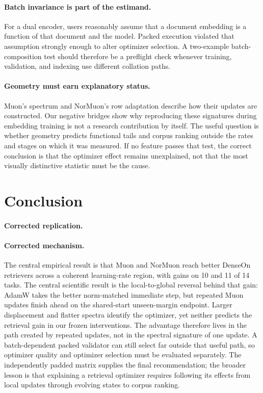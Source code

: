 \documentclass[11pt]{article}
\begin{document}
\paragraph{Batch invariance is part of the estimand.}
For a dual encoder, users reasonably assume that a document embedding is a function of that document
and the model. Packed execution violated that assumption strongly enough to alter optimizer
selection. A two-example batch-composition test should therefore be a preflight check whenever
training, validation, and indexing use different collation paths.

\paragraph{Geometry must earn explanatory status.}
Muon's spectrum and NorMuon's row adaptation describe how their updates are constructed. Our
negative bridges show why reproducing these signatures during embedding training is not a research
contribution by itself. The useful question is whether geometry predicts functional tails and
corpus ranking outside the rates and stages on which it was measured. If no feature passes that
test, the correct conclusion is that the optimizer effect remains unexplained, not that the most
visually distinctive statistic must be the cause.

\CandidateBreadthDiscussion

\FloatBarrier

\section{Conclusion}

\paragraph{Corrected replication.}
\CorrectedConclusionFinding

\paragraph{Corrected mechanism.}
\StateOperatorConclusionFinding

The central empirical result is that Muon and NorMuon reach better DenseOn retrievers across a
coherent learning-rate region, with gains on 10 and 11 of 14 tasks. The central scientific result is
the local-to-global reversal behind that gain: AdamW takes the better norm-matched immediate step,
but repeated Muon updates finish ahead on the shared-start unseen-margin endpoint. Larger
displacement and flatter spectra identify the optimizer, yet neither predicts the retrieval gain in
our frozen interventions. The advantage therefore lives in the path created by repeated updates,
not in the spectral signature of one update. A batch-dependent packed validator can still select
far outside that useful path, so optimizer quality and optimizer selection must be evaluated
separately. The independently padded matrix supplies the final recommendation; the broader lesson
is that explaining a retrieval optimizer requires following its effects from local updates through
evolving states to corpus ranking.
\end{document}
